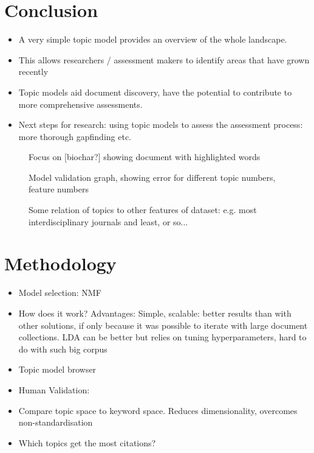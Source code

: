 \documentclass{article}
\begin{document}
\section*{Conclusion}
\begin{itemize}
	\item A very simple topic model provides an overview of the whole landscape.
    \item This allows researchers / assessment makers to identify areas that have grown recently
    \item Topic models aid document discovery, have the potential to contribute to more comprehensive assessments.
    \item Next steps for research: using topic models to assess the assessment process: more thorough gapfinding etc.
\end{itemize}




\begin{figure}
    \caption{Focus on [biochar?] showing document with highlighted words}
\end{figure}

\begin{figure}
    \caption{Model validation graph, showing error for different topic numbers, feature numbers}
\end{figure}


\begin{figure}
    \caption{Some relation of topics to other features of dataset: e.g. most interdisciplinary journals and least, or so...}
\end{figure}


\section*{Methodology}

\begin{itemize}
\item Model selection: NMF \citep{Lee1999}
\item How does it work? Advantages: Simple, scalable: better results than with other solutions, if only because it was possible to iterate with large document collections. LDA can be better but relies on tuning hyperparameters, hard to do with such big corpus
\item Topic model browser \citet{Chaney2012}
\item Human Validation: 
\item Compare topic space to keyword space. Reduces dimensionality, overcomes non-standardisation
\item Which topics get the most citations?

\end{itemize}
\end{document}
